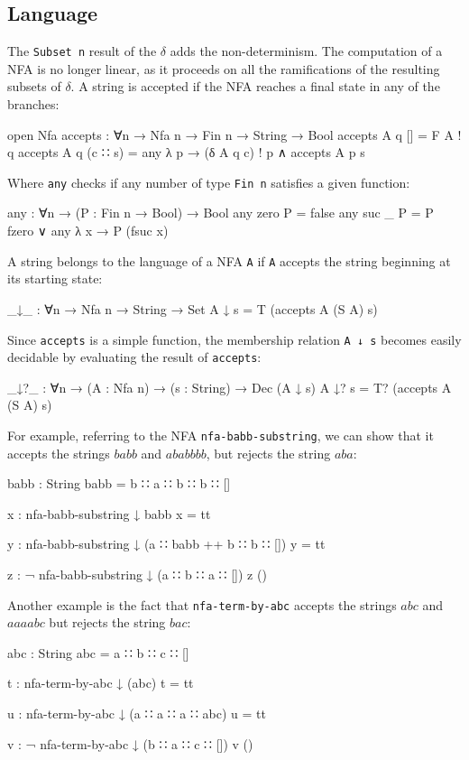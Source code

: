 \subsection{Language}
The \texttt{Subset n} result of the $\delta$ adds the non-determinism. The computation of a NFA is no longer linear, as it proceeds on all the ramifications of the resulting subsets of $\delta$. A string is accepted if the NFA reaches a final state in any of the branches:
\begin{agda}
open Nfa
accepts : ∀{n} → Nfa n → Fin n → String → Bool
accepts A q []       = F A ! q
accepts A q (c ∷ s) 
  = any λ p → (δ A q c) ! p ∧ accepts A p s
\end{agda}
Where \texttt{any} checks if any number of type \texttt{Fin n} satisfies a given function:
\begin{agda}
any : ∀{n} → (P : Fin n → Bool) → Bool
any {zero}  P = false
any {suc _} P = P fzero ∨ any λ x → P (fsuc x)
\end{agda}
A string belongs to the language of a NFA \texttt{A} if \texttt{A} accepts the string beginning at its starting state:
\begin{agda}
_↓_ : ∀{n} → Nfa n → String → Set
A ↓ s  = T (accepts A (S A) s)
\end{agda}
Since \texttt{accepts} is a simple function, the membership relation \texttt{A ↓ s} becomes easily decidable by evaluating the result of \texttt{accepts}:
\begin{agda}
_↓?_ : ∀{n} → (A : Nfa n) → (s : String) → Dec (A ↓ s)
A ↓? s = T? (accepts A (S A) s)
\end{agda}
For example, referring to the NFA \texttt{nfa-babb-substring}, we can show that it accepts the strings $babb$ and $ababbbb$, but rejects the string $aba$:
\begin{agda}
babb : String
babb = b ∷ a ∷ b ∷ b ∷ []

x : nfa-babb-substring ↓ babb
x = tt

y : nfa-babb-substring ↓ (a ∷ babb ++ b ∷ b ∷ [])
y = tt

z : ¬ nfa-babb-substring ↓ (a ∷ b ∷ a ∷ [])
z ()
\end{agda}
Another example is the fact that \texttt{nfa-term-by-abc} accepts the strings $abc$ and $aaaabc$ but rejects the string $bac$:
\begin{agda}
abc : String
abc = a ∷ b ∷ c ∷ []

t : nfa-term-by-abc ↓ (abc)
t = tt

u : nfa-term-by-abc ↓ (a ∷ a ∷ a ∷ abc)
u = tt

v : ¬ nfa-term-by-abc ↓ (b ∷ a ∷ c ∷ [])
v ()
\end{agda}
